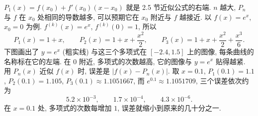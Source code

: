 \documentclass[UTF8,openany]{ctexbook}
\theoremstyle{chinesetextbook}
\begin{document}
$P_1(x)=f(x_0)+f'(x_0)(x-x_0)$ 就是 2.5 节近似公式的右端. $n$ 越大, $P_n$ 与 $f$ 在 $x_0$ 处相同的导数越多, 可以预期它在 $x_0$ 附近与 $f$ 越接近. 以 $f(x)=e^x$, $x_0=0$ 为例. $f^{(k)}(x)=e^x$, $f^{(k)}(0)=1$, 所以
\[
P_1(x)=1+x,\qquad P_2(x)=1+x+\frac{x^2}2,\qquad P_3(x)=1+x+\frac{x^2}2+\frac{x^3}6.
\]
下图画出了 $y=e^x$ (粗实线) 与这三个多项式在 $[-2.4,1.5]$ 上的图像, 每条曲线的名称标在它的左端. 在 $0$ 附近, 多项式的次数越高, 它的图像与 $y=e^x$ 贴得越紧. 用 $P_n(x)$ 近似 $f(x)$ 时, 误差是 $|f(x)-P_n(x)|$. 取 $x=0.1$, $P_1(0.1)=1.1$, $P_2(0.1)=1.105$, $P_3(0.1)\approx1.1051667$, 而 $e^{0.1}\approx1.1051709$, 三个误差依次约为
\[
5.2\times10^{-3},\qquad1.7\times10^{-4},\qquad4.3\times10^{-6}.
\]
在 $x=0.1$ 处, 多项式的次数每增加 $1$, 误差就缩小到原来的几十分之一.
\begin{center}
\end{center}
\end{document}
